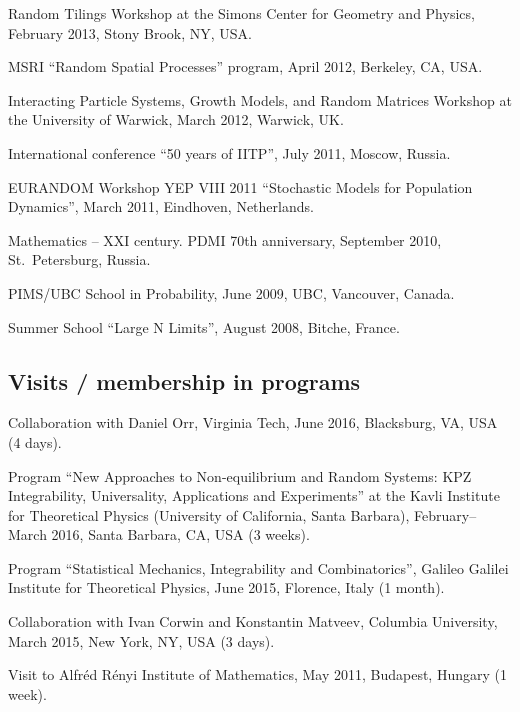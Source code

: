 \documentclass[letterpaper,11pt]{article}
\begin{document}
\begin{etaremune}
	\item
	      Random Tilings Workshop at the
	      Simons Center for Geometry and Physics,
	      February 2013, Stony Brook, NY, USA.

	\item
	      MSRI ``Random Spatial Processes'' program,
	      April 2012, Berkeley, CA, USA.

	\item
	      Interacting Particle Systems, Growth Models, and Random Matrices
	      Workshop at
	      the University of Warwick, March 2012, Warwick, UK.

	\item
	      International conference ``50 years of IITP'', July 2011,
	      Moscow,
	      Russia.

	\item
	      EURANDOM Workshop YEP VIII 2011 ``Stochastic Models for
	      Population
	      Dynamics'', March 2011, Eindhoven, Netherlands.

	\item
	      Mathematics -- XXI century. PDMI 70th anniversary, September
	      2010,
	      St.~Petersburg, Russia.

	\item
	      PIMS/UBC School in Probability, June 2009, UBC, Vancouver,
	      Canada.

	\item
	      Summer School ``Large N Limits'', August 2008, Bitche, France.
\end{etaremune}

\subsection*{Visits / membership in programs}

\begin{etaremune}
	\item
	      Collaboration with Daniel Orr,
	      Virginia Tech,
	      June 2016,
	      Blacksburg, VA, USA (4 days).
	\item
	      Program ``New Approaches to Non-equilibrium and Random Systems:
	      KPZ
	      Integrability, Universality, Applications and Experiments''
	      at the Kavli Institute for Theoretical Physics (University of
	      California, Santa Barbara),
	      February--March 2016, Santa Barbara, CA, USA (3 weeks).
	\item
	      Program ``Statistical Mechanics, Integrability and
	      Combinatorics'',
	      Galileo Galilei Institute for Theoretical Physics, June 2015,
	      Florence, Italy (1 month).
	\item
	      Collaboration with Ivan Corwin and Konstantin Matveev,
	      Columbia University, March 2015, New York, NY, USA (3 days).
	\item
	      Visit to Alfr\'ed R\'enyi Institute of Mathematics,
	      May 2011, Budapest, Hungary (1 week).
\end{etaremune}
\end{document}
